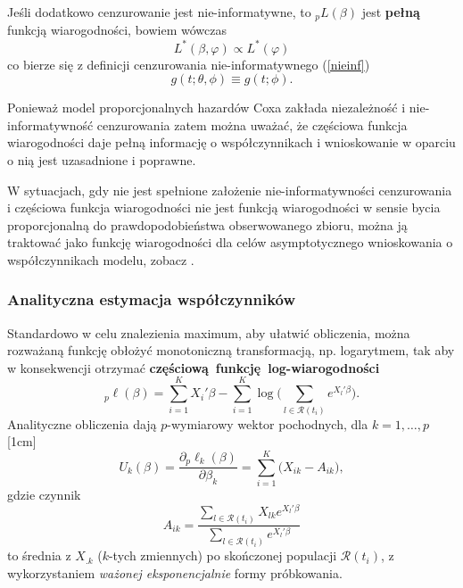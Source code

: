 Jeśli dodatkowo cenzurowanie jest nie-informatywne, to ${}_{p}L(\beta)$ jest \textbf{pełną} funkcją wiarogodności, bowiem wówczas $$L^{*}(\beta,\varphi)\propto L^{*}(\varphi)$$ co bierze się z definicji cenzurowania nie-informatywnego (\ref{nieinf}) $$g(t;\theta, \phi) \equiv g(t;\phi).$$

Ponieważ model proporcjonalnych hazardów Coxa zakłada niezależność i nie-informatywność cenzurowania zatem można uważać, że częściowa funkcja wiarogodności daje pełną informację o współczynnikach i wnioskowanie w oparciu o nią jest uzasadnione i poprawne.

W sytuacjach, gdy nie jest spełnione założenie nie-informatywności cenzurowania i częściowa funkcja wiarogodności nie jest funkcją wiarogodności w sensie bycia proporcjonalną do prawdopodobieństwa obserwowanego zbioru, można ją traktować jako funkcję wiarogodności dla celów asymptotycznego wnioskowania o współczynnikach modelu, zobacz \cite{ther}.


\subsubsection{Analityczna estymacja współczynników}
Standardowo w celu znalezienia maximum, aby ułatwić obliczenia, można rozważaną funkcję obłożyć monotoniczną transformacją, np. logarytmem, tak aby w konsekwencji otrzymać \textbf{częściową~funkcję~log-wiarogodności}
\begin{equation}
{}_{p}\ell(\beta) = \sum\limits_{i=1}^{K}X_i'\beta - \sum\limits_{i=1}^{K}\log\Big(\sum\limits_{l\in \mathscr{R}(t_i)}^{}e^{X_l'\beta}\Big).
\end{equation}
Analityczne obliczenia dają $p$-wymiarowy wektor pochodnych, dla $k=1,\dots,p$
[1cm]
\begin{equation}\label{score}
U_k(\beta)=\dfrac{\partial{}_{p}\ell_k(\beta)}{\partial\beta_k}=\sum\limits_{i=1}^{K}\Big(X_{ik}-A_{ik}\Big),
\end{equation}
gdzie czynnik
\begin{equation}
A_{ik} = \dfrac{\sum\limits_{l\in \mathscr{R}(t_i)}^{} X_{lk} e^{X_l'\beta}}{\sum\limits_{l\in \mathscr{R}(t_i)}^{} e^{X_l'\beta}}
\end{equation}
to średnia z $X_{.k}$ ($k$-tych zmiennych) po skończonej populacji $\mathscr{R}(t_i)$, z wykorzystaniem \textit{ważonej eksponencjalnie} formy próbkowania.

